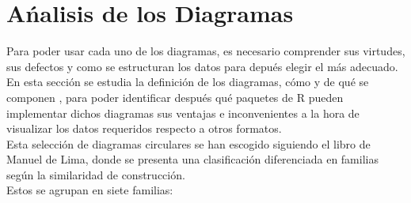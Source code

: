 \documentclass{article}\usepackage[]{graphicx}\usepackage[]{color}
\begin{document}
\section{A\'nalisis de los Diagramas}\label{sec:Analisis}
Para poder usar cada uno de los diagramas, es necesario comprender sus virtudes, sus defectos y como se estructuran los datos para depu\'es elegir el m\'as adecuado.~\\
En esta secci\'on se estudia la definici\'on de los diagramas, c\'omo y de qu\'e se componen , para poder identificar despu\'es qu\'e paquetes de R pueden implementar dichos diagramas sus ventajas e inconvenientes a la hora de visualizar los datos requeridos respecto a otros formatos.~\\
Esta selecci\'on de diagramas circulares se han escogido siguiendo el libro de Manuel de Lima\cite{Circle}, donde se presenta una clasificaci\'on diferenciada en familias seg\'un la similaridad de construcci\'on.~\\ Estos se agrupan en siete familias:
\end{document}

